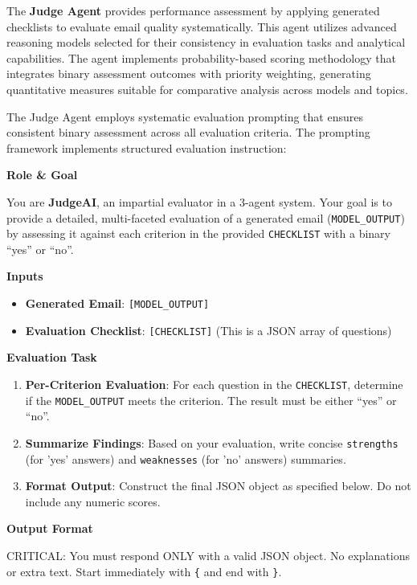 The \textbf{Judge Agent} provides performance assessment by applying generated checklists to evaluate email quality systematically. This agent utilizes advanced reasoning models selected for their consistency in evaluation tasks and analytical capabilities. The agent implements probability-based scoring methodology that integrates binary assessment outcomes with priority weighting, generating quantitative measures suitable for comparative analysis across models and topics.

The Judge Agent employs systematic evaluation prompting that ensures consistent binary assessment across all evaluation criteria. The prompting framework implements structured evaluation instruction:

\begin{promptbox}[title={Judge Agent Prompt Template}]
\textbf{Role \& Goal}

You are \textbf{JudgeAI}, an impartial evaluator in a 3-agent system. Your goal is to provide a detailed, multi-faceted evaluation of a generated email (\texttt{MODEL\_OUTPUT}) by assessing it against each criterion in the provided \texttt{CHECKLIST} with a binary ``yes'' or ``no''.

\textbf{Inputs}
\begin{itemize}
\item \textbf{Generated Email}: \texttt{[MODEL\_OUTPUT]}
\item \textbf{Evaluation Checklist}: \texttt{[CHECKLIST]} (This is a JSON array of questions)
\end{itemize}

\textbf{Evaluation Task}
\begin{enumerate}
\item \textbf{Per-Criterion Evaluation}: For each question in the \texttt{CHECKLIST}, determine if the \texttt{MODEL\_OUTPUT} meets the criterion. The result must be either ``yes'' or ``no''.
\item \textbf{Summarize Findings}: Based on your evaluation, write concise \texttt{strengths} (for 'yes' answers) and \texttt{weaknesses} (for 'no' answers) summaries.
\item \textbf{Format Output}: Construct the final JSON object as specified below. Do not include any numeric scores.
\end{enumerate}

\textbf{Output Format}

CRITICAL: You must respond ONLY with a valid JSON object. No explanations or extra text. Start immediately with \texttt{\{} and end with \texttt{\}}.
\end{promptbox}

